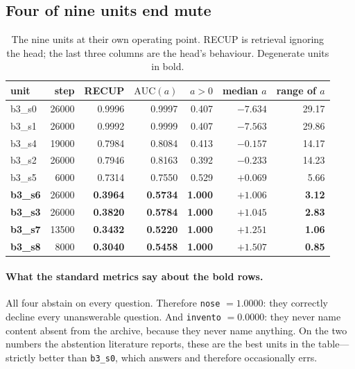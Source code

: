 \documentclass[11pt]{article}
\begin{document}
\subsection{Four of nine units end mute}
\label{sec:mudas}

\begin{table}[h]
\centering
\caption{The nine units at their own operating point. RECUP is retrieval ignoring the head; the last
three columns are the head's behaviour. Degenerate units in bold.}
\begin{tabular}{lrrrrrr}
\toprule
unit & step & RECUP & $\mathrm{AUC}(a)$ & $a > 0$ & median $a$ & range of $a$ \\
\midrule
b3\_s0 & 26000 & 0.9996 & 0.9997 & 0.407 & $-7.634$ & 29.17 \\
b3\_s1 & 26000 & 0.9992 & 0.9999 & 0.407 & $-7.563$ & 29.86 \\
b3\_s4 & 19000 & 0.7984 & 0.8084 & 0.413 & $-0.157$ & 14.17 \\
b3\_s2 & 26000 & 0.7946 & 0.8163 & 0.392 & $-0.233$ & 14.23 \\
b3\_s5 & 6000  & 0.7314 & 0.7550 & 0.529 & $+0.069$ & 5.66 \\
\midrule
\textbf{b3\_s6} & 26000 & \textbf{0.3964} & \textbf{0.5734} & \textbf{1.000} & $+1.006$ & \textbf{3.12} \\
\textbf{b3\_s3} & 26000 & \textbf{0.3820} & \textbf{0.5784} & \textbf{1.000} & $+1.045$ & \textbf{2.83} \\
\textbf{b3\_s7} & 13500 & \textbf{0.3432} & \textbf{0.5220} & \textbf{1.000} & $+1.251$ & \textbf{1.06} \\
\textbf{b3\_s8} & 8000  & \textbf{0.3040} & \textbf{0.5458} & \textbf{1.000} & $+1.507$ & \textbf{0.85} \\
\bottomrule
\end{tabular}
\label{tab:nueve}
\end{table}

\paragraph{What the standard metrics say about the bold rows.} All four abstain on every question.
Therefore \texttt{nose} $=1.0000$: they correctly decline every unanswerable question. And
\texttt{invento} $=0.0000$: they never name content absent from the archive, because they never name
anything. On the two numbers the abstention literature reports, these are the best units in the
table---strictly better than \texttt{b3\_s0}, which answers and therefore occasionally errs.
\end{document}
